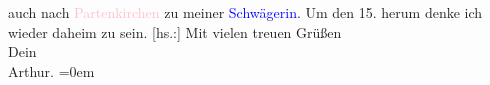                auch nach \textcolor{pink}{Partenkirchen}{}\ledrightnote{\textcolor{pink}{Garmisch-Partenkirchen}} zu meiner \textcolor{blue}{Schwägerin}{}. Um den 15. herum denke ich wieder daheim zu sein.\pend
           \pstart
           {[}hs.:{]} Mit vielen treuen Grüßen{\\[\baselineskip]}Dein{\\[\baselineskip]}\spacefill\mbox{Arthur.}\pend
           \leftskip=0em{}\endnumbering{}  
      